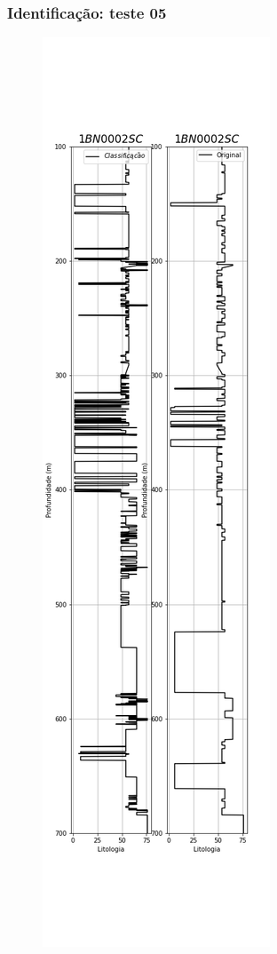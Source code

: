 \documentclass[aspectratio=10]{beamer} %
\begin{document}
\begin{frame}
	\frametitle{Identificação: teste 05}
	\begin{figure}[H]
		\centering
		\includegraphics[scale=0.18]{Imagens/result05.png}
		\label{IDt05}
	\end{figure} 
\end{frame}
\end{document}
